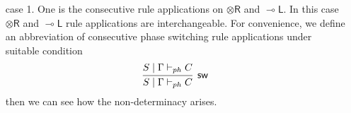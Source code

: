 \documentclass[submission,copyright,creativecommons]{eptcs}
\theoremstyle{definition}
\newcommand{\tr}{\otimes \mathsf{R}}
\newcommand{\lleft}{{\multimap}\mathsf{L}}
\begin{document}
\begin{itemize}
  \item[case 1.] One is the consecutive rule applications on $\tr$ and $\lleft$.
  In this case $\tr$ and $\lleft$ rule applications are interchangeable.
  For convenience, we define an abbreviation of consecutive phase switching rule applications under suitable condition
  \begin{displaymath}
    \infer[\mathsf{sw}]{S \mid \Gamma \vdash_{ph} C}{S \mid \Gamma \vdash_{ph} C}
  \end{displaymath}
  then we can see how the non-determinacy arises.


\end{itemize}
\end{document}
